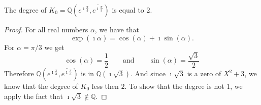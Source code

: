 \begin{lemma}
    \label{lem:degree_K0_angel}
    \leanok
    The degree of $K_0 = \mathbb{Q}(e^{\imath\frac{\pi}{3}},\overline{e^{\imath\frac{\pi}{3}}})$ is equal  to $2$. 
\end{lemma}
\begin{proof}
    For all real numbers $\alpha$, we have that  $$ \exp(\imath \alpha) = \cos(\alpha) + \imath \sin(\alpha).$$
    For $\alpha = \pi / 3$ we get
    \begin{equation*}
        \cos(\alpha) = \frac{1}{2}\qquad \text{and}\qquad \sin(\alpha) = \frac{\sqrt{3}}{2}
    \end{equation*}
    Therefore $\mathbb{Q}(e^{\imath\frac{\pi}{3}},\overline{e^{\imath\frac{\pi}{3}}})$ is in $\mathbb{Q}(\imath\sqrt{3})$.
    And since $\imath\sqrt{3}$ is a zero of $X^2 + 3$, we know that the degree of $K_0$ less then $2$.
    To show that the degree is not $1$, we apply the fact that $\imath\sqrt{3} \notin \mathbb{Q}$.
\end{proof}


